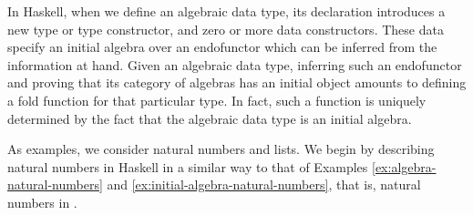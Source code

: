 In Haskell, when we define an algebraic data type, its declaration
introduces a new type or type constructor, and zero or more data
constructors. These data specify an initial algebra over an
endofunctor which can be inferred from the information at hand. Given
an algebraic data type, inferring such an endofunctor and proving that
its category of algebras has an initial object amounts to defining a
fold function for that particular type. In fact, such a function is
uniquely determined by the fact that the algebraic data type is an
initial algebra.

As examples, we consider natural numbers and lists. We begin by
describing natural numbers in Haskell in a similar way to that of
Examples \ref{ex:algebra-natural-numbers} and
\ref{ex:initial-algebra-natural-numbers}, that is, natural numbers in
\set.

